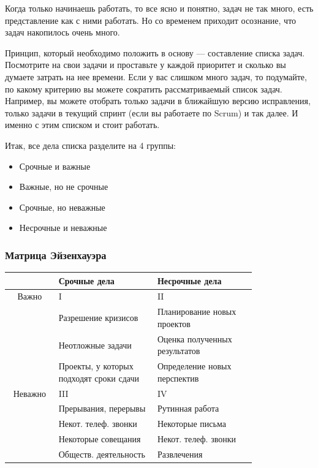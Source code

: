 \documentclass{../industrial-development}
\begin{document}
\lecturenotes

Когда только начинаешь работать, то все ясно и понятно, задач не так много, есть представление как с ними работать. Но со временем приходит осознание, что задач накопилось очень много.

Принцип, который необходимо положить в основу — составление списка задач. Посмотрите на свои задачи и проставьте у каждой приоритет и сколько вы думаете затрать на нее времени. Если у вас слишком много задач, то подумайте, по какому критерию вы можете сократить рассматриваемый список задач. Например, вы можете отобрать только задачи в ближайшую версию исправления, только задачи в текущий спринт (если вы работаете по Scrum) и так далее. И именно с этим списком и стоит работать.

Итак, все дела списка разделите на 4 группы:
\begin{itemize}
\item Срочные и важные
\item Важные, но не срочные
\item Срочные, но неважные
\item Несрочные и неважные~\cite{TMHabr}
\end{itemize}

\begin{frame} \frametitle{Матрица Эйзенхауэра}
  \begin{table}
    \begin{tabular}{|c|p{0.4\linewidth}|p{0.4\linewidth}|}
		\hline
		& Срочные дела & Несрочные дела \\
		\hline
		Важно & I & II \\
		 & Разрешение кризисов & Планирование новых проектов \\
		 & Неотложные задачи & Оценка полученных результатов \\
		 & Проекты, у которых подходят сроки сдачи & Определение новых перспектив \\
		\hline
		Неважно & III & IV \\
		 & Прерывания, перерывы & Рутинная работа \\
		 & Некот. телеф. звонки & Некоторые письма \\
		 & Некоторые совещания & Некот. телеф. звонки \\
		 & Обществ. деятельность & Развлечения \\
		\hline
    \end{tabular}
  \end{table}
\end{frame}
\end{document}
